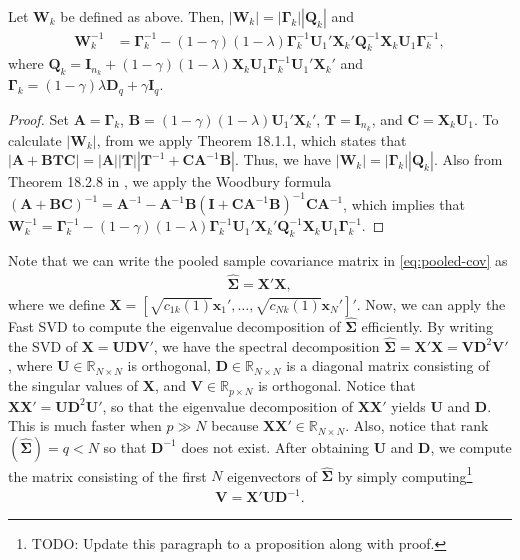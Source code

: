 \documentclass[11pt]{article}
\begin{document}
\begin{proposition}\label{proposition:rda-W_k}
Let $\bm W_k$ be defined as above. Then, $|\bm W_k| = |\bm \Gamma_k| |\bm Q_k|$ and
	\begin{align}
		\bm W_k^{-1} &= \bm \Gamma_k^{-1} - (1 - \gamma)(1 - \lambda) \bm \Gamma_k^{-1} \bm U_1' \bm X_k' \bm Q_k^{-1} \bm X_k \bm U_1 \bm \Gamma_k^{-1},
	\end{align}
where $\bm Q_k = \bm I_{n_k} + (1 - \gamma)(1- \lambda) \bm X_k \bm U_1 \bm \Gamma_k^{-1} \bm U_1' \bm X_k'$ and $\bm \Gamma_k = (1 - \gamma) \lambda \bm D_q + \gamma \bm I_q$.
\end{proposition}
\begin{proof}
	Set $\bm A = \bm \Gamma_k$, $\bm B = (1 - \gamma)(1 - \lambda) \bm U_1' \bm X_k'$, $\bm T = \bm I_{n_k}$, and $\bm C = \bm X_k \bm U_1$. To calculate $|\bm W_k|$, from \cite{Harville:2008wja} we apply Theorem 18.1.1, which states that $|\bm A + \bm B \bm T \bm C| = |\bm A| |\bm T| |\bm T^{-1} + \bm C \bm A^{-1} \bm B|$. Thus, we have $|\bm W_k| = |\bm \Gamma_k| |\bm Q_k|$. Also from Theorem 18.2.8 in \cite{Harville:2008wja}, we apply the Woodbury formula $(\bm A + \bm B \bm C)^{-1} = \bm A^{-1} - \bm A^{-1} \bm B(\bm I + \bm C \bm A^{-1} \bm B)^{-1} \bm C \bm A^{-1}$, which implies that $\bm W_k^{-1} = \bm \Gamma_k^{-1} - (1 - \gamma)(1 - \lambda) \bm \Gamma_k^{-1} \bm U_1' \bm X_k' \bm Q_k^{-1} \bm X_k \bm U_1 \bm \Gamma_k^{-1}$.
\end{proof}


Note that we can write the pooled sample covariance matrix in \eqref{eq:pooled-cov} as
\begin{align*}
	\widehat{\bm\Sigma} = \bm X' \bm X,
\end{align*}
where we define $\bm X = [\sqrt{c_{1k}(1)} \bm x_1', \ldots,  \sqrt{c_{Nk}(1)} \bm x_N']'$. Now, we can apply the Fast SVD to compute the eigenvalue decomposition of $\widehat{\bm\Sigma}$ efficiently. By writing the SVD of $\bm X = \bm U \bm D \bm V'$, we have the spectral decomposition $\widehat{\bm\Sigma} = \bm X' \bm X = \bm V \bm D^2 \bm V'$, where $\bm U \in \mathbb{R}_{N \times N}$ is orthogonal, $\bm D \in \mathbb{R}_{N \times N}$ is a diagonal matrix consisting of the singular values of $\bm X$, and $\bm V \in \mathbb{R}_{p \times N}$ is orthogonal. Notice that $\bm X \bm X' = \bm U \bm D^2 \bm U'$, so that the eigenvalue decomposition of $\bm X \bm X'$ yields $\bm U$ and $\bm D$. This is much faster when $p \gg N$ because $\bm X \bm X' \in \mathbb{R}_{N \times N}$. Also, notice that rank$(\widehat{\bm \Sigma}) = q < N$ so that $\bm D^{-1}$ does not exist.  After obtaining $\bm U$ and $\bm D$, we compute the matrix consisting of the first $N$ eigenvectors of $\widehat{\bm\Sigma}$ by simply computing\footnote{TODO: Update this paragraph to a proposition along with proof.}
\begin{align*}
	\bm V = \bm X' \bm U \bm D^{-1}.
\end{align*}
\end{document}
